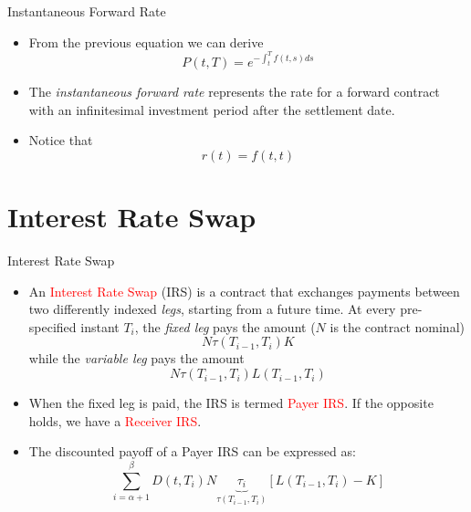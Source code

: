 \documentclass{beamer}
\begin{document}
\begin{frame}{Instantaneous Forward Rate}
	\begin{itemize}
		\item From the previous equation we can derive
		\begin{equation}
			P(t, T) = e^{-\int_t^T f(t, s) ds}
		\end{equation}
		\item The \emph{instantaneous forward rate} represents the rate for a forward contract with an infinitesimal investment period after the settlement date.
		\item Notice that
		\begin{equation*}
			r(t) = f(t,t)
		\end{equation*}
	\end{itemize}
\end{frame}

\section{Interest Rate Swap}
\begin{frame}{Interest Rate Swap}
	\begin{itemize}
		\item An \textcolor{red}{Interest Rate Swap} (IRS) is a contract that exchanges payments between two differently indexed \emph{legs}, starting from a future time. At every pre-specified instant $T_i$, the \emph{fixed leg} pays the amount ($N$ is the contract nominal)
		\begin{equation*}
			N\tau(T_{i-1}, T_i)K
		\end{equation*}
		while the \emph{variable leg} pays the amount
		\begin{equation*}
			N\tau(T_{i-1}, T_i)L(T_{i-1}, T_i)
		\end{equation*}
		\item<2-> When the fixed leg is paid, the IRS is termed \textcolor{red}{Payer IRS}. If the opposite holds, we have a \textcolor{red}{Receiver IRS}.
		\item<3-> The discounted payoff of a Payer IRS can be expressed as:
		\begin{equation}
			\sum_{i=\alpha+1}^{\beta} D(t,T_i)N \underbrace{\tau_i}_{\tau(T_{i-1},T_i)}
			\left[L(T_{i-1},T_i)-K\right]
			\label{eq:payoff_payer_irs}
		\end{equation}	
	\end{itemize}
\end{frame}
\end{document}
